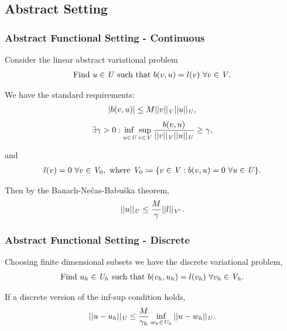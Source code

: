 \subsection{Abstract Setting}

\begin{frame}
\frametitle{Abstract Functional Setting - Continuous}

Consider the linear abstract variational problem
\begin{align} \label{eq:bilinear_abstract_infinite}
\text{Find}\ u \in \mathit{{{U}}}\ \text{such that}\
b(v,u) = l(v)\ \forall v \in \mathit{{{V}}}.
\end{align}

We have the standard requirements:
\begin{align}
| b(v,u) | \le M
||v||_{\mathit{{{V}}}}
||u||_{\mathit{{{U}}}},
\end{align}
\begin{align} \label{eq:inf_sup_infinite}
\exists \gamma > 0 :
\adjustlimits\inf_{u\in\fspace{U}} \sup_{v\in\fspace{V}}
\frac{b(v,u)}{||v||_{\fspace{V}}||u||_{\fspace{U}}} \ge \gamma,
\end{align}

and
\begin{align}
l(v) = 0\ \forall v \in \mathit{{{V}}}_0,\ \text{where}\ \mathit{{{V}}}_0 \coloneqq \{v \in \mathit{{{V}}} : b(v,u) = 0\ \forall u
\in \mathit{{{U}}} \}.
\end{align}

Then by the Banach-Ne\v{c}as-Babu\v{s}ka theorem,
\begin{align}
||u||_{\mathit{{{U}}}} \le \frac{M}{\gamma} ||l||_{\mathit{{{V}}}'}.
\end{align}


\end{frame}

\begin{frame}
\frametitle{Abstract Functional Setting - Discrete}

Choosing finite dimensional subsets we have the discrete variational problem,
\begin{align} \label{eq:bilinear_abstract_finite}
\text{Find}\ u_h \in \mathit{{{U}}}_h\ \text{such that}\
b(v_h,u_h) = l(v_h)\ \forall v_h \in \mathit{{{V}}}_h.
\end{align}

If a discrete version of the inf-sup condition holds,
\begin{align} \label{eq:abstract_dpg_error}
||u-u_h||_{\mathit{{{U}}}} \le \frac{M}{\gamma_h} \inf_{w_h \in \mathit{{{U}}}_h} ||u-w_h||_{\mathit{{{U}}}}.
\end{align}

\end{frame}

